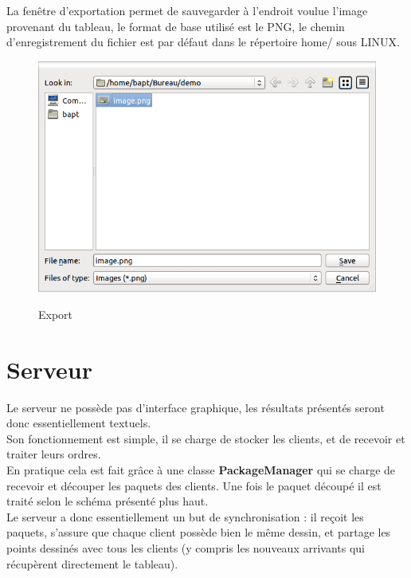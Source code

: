 \documentclass{report}
\begin{document}
				La fenêtre d'exportation permet de sauvegarder à l'endroit voulue l'image provenant du tableau, le format de base utilisé est le PNG, le chemin d'enregistrement du fichier est par défaut dans le répertoire home/ sous LINUX. \\
				\begin{figure}[!h]
						\centering
						\includegraphics[scale=0.4]{../images/export.png}\\
						\caption{Export}
						\label{Export}
				\end{figure}
				\newpage
		\section{Serveur} %
		Le serveur ne possède pas d'interface graphique, les résultats présentés seront donc essentiellement textuels. \\
		Son fonctionnement est simple, il se charge de stocker les clients, et de recevoir et traiter leurs ordres.\\
		En pratique cela est fait grâce à une classe \textbf{PackageManager} qui se charge de recevoir et découper les paquets des clients. Une fois le paquet découpé il est traité selon le schéma présenté plus haut. \\
		Le serveur a donc essentiellement un but de synchronisation : il reçoit les paquets, s'assure que chaque client possède bien le même dessin, et partage les points dessinés avec tous les clients (y compris les nouveaux arrivants qui récupèrent directement le tableau). \\
	
\end{document}

